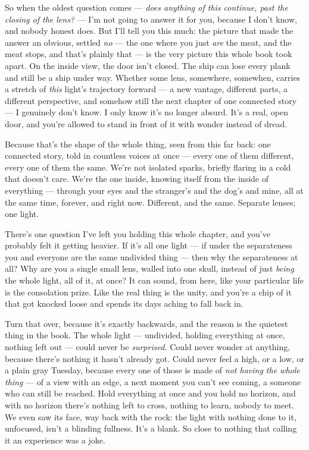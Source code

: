 \documentclass[11pt,openany]{book}
\begin{document}
So when the oldest question comes — \textit{does anything of this continue, past the closing of the lens?} — I’m not going to answer it for you, because I don’t know, and nobody honest does. But I’ll tell you this much: the picture that made the answer an obvious, settled \textit{no} — the one where you just \textit{are} the meat, and the meat stops, and that’s plainly that — is the very picture this whole book took apart. On the inside view, the door isn’t closed. The ship can lose every plank and still be a ship under way. Whether some lens, somewhere, somewhen, carries a stretch of \textit{this} light’s trajectory forward — a new vantage, different parts, a different perspective, and somehow still the next chapter of one connected story — I genuinely don’t know. I only know it’s no longer absurd. It’s a real, open door, and you’re allowed to stand in front of it with wonder instead of dread.

Because that’s the shape of the whole thing, seen from this far back: one connected story, told in countless voices at once — every one of them different, every one of them the same. We’re not isolated sparks, briefly flaring in a cold that doesn’t care. We’re the one inside, knowing itself from the inside of everything — through your eyes and the stranger’s and the dog’s and mine, all at the same time, forever, and right now. Different, and the same. Separate lenses; one light.

There’s one question I’ve left you holding this whole chapter, and you’ve probably felt it getting heavier. If it’s all one light — if under the separateness you and everyone are the same undivided thing — then why the separateness at all? Why are you a single small lens, walled into one skull, instead of just \textit{being} the whole light, all of it, at once? It can sound, from here, like your particular life is the consolation prize. Like the real thing is the unity, and you’re a chip of it that got knocked loose and spends its days aching to fall back in.

Turn that over, because it’s exactly backwards, and the reason is the quietest thing in the book. The whole light — undivided, holding everything at once, nothing left out — could never be \textit{surprised.} Could never wonder at anything, because there’s nothing it hasn’t already got. Could never feel a high, or a low, or a plain gray Tuesday, because every one of those is made of \textit{not having the whole thing} — of a view with an edge, a next moment you can’t see coming, a someone who can still be reached. Hold everything at once and you hold no horizon, and with no horizon there’s nothing left to cross, nothing to learn, nobody to meet. We even saw its face, way back with the rock: the light with nothing done to it, unfocused, isn’t a blinding fullness. It’s a blank. So close to nothing that calling it an experience was a joke.
\end{document}
